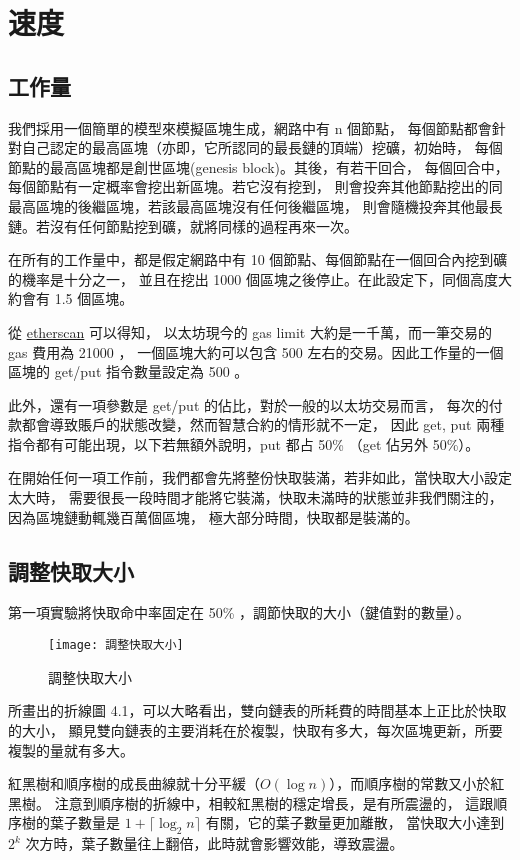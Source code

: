 \section{速度}

\subsection{工作量}
我們採用一個簡單的模型來模擬區塊生成，網路中有 n 個節點，
每個節點都會針對自己認定的最高區塊（亦即，它所認同的最長鏈的頂端）挖礦，初始時，
每個節點的最高區塊都是創世區塊(genesis block)。其後，有若干回合，
每個回合中，每個節點有一定概率會挖出新區塊。若它沒有挖到，
則會投奔其他節點挖出的同最高區塊的後繼區塊，若該最高區塊沒有任何後繼區塊，
則會隨機投奔其他最長鏈。若沒有任何節點挖到礦，就將同樣的過程再來一次。

在所有的工作量中，都是假定網路中有 10 個節點、每個節點在一個回合內挖到礦的機率是十分之一，
並且在挖出 1000 個區塊之後停止。在此設定下，同個高度大約會有 1.5 個區塊。

從 \href{https://etherscan.io/chart/gaslimit}{etherscan} 可以得知，
以太坊現今的 gas limit 大約是一千萬，而一筆交易的 gas 費用為 21000 ，
一個區塊大約可以包含 500 左右的交易。因此工作量的一個區塊的 get/put 指令數量設定為 500 。

此外，還有一項參數是 get/put 的佔比，對於一般的以太坊交易而言，
每次的付款都會導致賬戶的狀態改變，然而智慧合約的情形就不一定，
因此 get, put 兩種指令都有可能出現，以下若無額外說明，put 都占 50\% （get 佔另外 50\%）。

在開始任何一項工作前，我們都會先將整份快取裝滿，若非如此，當快取大小設定太大時，
需要很長一段時間才能將它裝滿，快取未滿時的狀態並非我們關注的，因為區塊鏈動輒幾百萬個區塊，
極大部分時間，快取都是裝滿的。

\subsection{調整快取大小}

第一項實驗將快取命中率固定在 50\% ，調節快取的大小（鍵值對的數量）。

\begin{figure}[h!]
\texttt{[image: 調整快取大小]}
\caption{調整快取大小}
\end{figure}

所畫出的折線圖 4.1，可以大略看出，雙向鏈表的所耗費的時間基本上正比於快取的大小，
顯見雙向鏈表的主要消耗在於複製，快取有多大，每次區塊更新，所要複製的量就有多大。

紅黑樹和順序樹的成長曲線就十分平緩（$O(\log n)$），而順序樹的常數又小於紅黑樹。
注意到順序樹的折線中，相較紅黑樹的穩定增長，是有所震盪的，
這跟順序樹的葉子數量是 $1 + \lceil \log_2 n \rceil$ 有關，它的葉子數量更加離散，
當快取大小達到 $2^k$ 次方時，葉子數量往上翻倍，此時就會影響效能，導致震盪。

